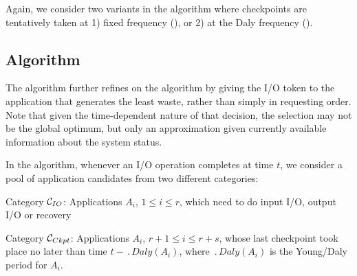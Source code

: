 Again, we consider two variants in the \fifononblock algorithm where checkpoints are
tentatively taken at 1) fixed frequency (\fifofixed), or 2) at the
Daly frequency (\fifodaly).



\subsection{\leastwaste Algorithm}
\label{sec:least-waste}

The \leastwaste algorithm further refines on the \fifononblock algorithm
by giving the I/O token to the application that generates the least
waste, rather than simply in requesting order. Note that given the time-dependent nature of that decision, the selection may
not be the global optimum, but only an approximation given currently
available information about the system status.

In the \leastwaste algorithm, whenever an I/O operation completes at time $t$,
we consider a pool of application candidates from two different categories:
\begin{compactitem}
 \item Category \IOcat $\mathcal{C}_{IO}$: Applications $A_{i}$, $1\leq i \leq r$, which
 need to do input I/O, output I/O or recovery
 \item Category \Ckptcat $\mathcal{C}_{Ckpt}$: Applications $A_{i}$, $r+1\leq i \leq r+s$,
 whose last checkpoint took place no later than time $t - \period{Daly}(A_{i})$, where
 $\period{Daly}(A_{i})$ is the Young/Daly period for $A_{i}$.
\end{compactitem}

